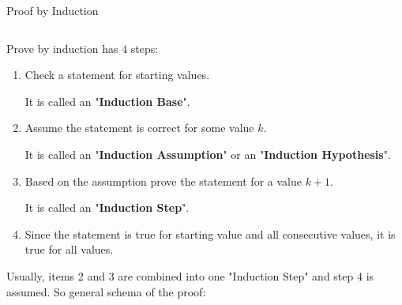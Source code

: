 \documentclass[9pt,aspectratio=169]{beamer}
\begin{document}
\begin{frame}{Proof by Induction}
  \begin{columns}[T]
    \begin{column}{0.5\textwidth}
      Prove by induction has $4$ steps:

      \begin{enumerate}
        \item Check a statement for starting values.

        It is called an "\textbf{Induction Base}".

        \item Assume the statement is correct for some value $k$.
        
        It is called an "\textbf{Induction Assumption}" or an "\textbf{Induction Hypothesis}".

        \item Based on the assumption prove the statement for a value $k+1$.
        
        It is called an "\textbf{Induction Step}".

        \item Since the statement is true for starting value and all consecutive values, it is true for all values.
      \end{enumerate}\pause

      Usually, items 2 and 3 are combined into one "Induction Step" and step 4 is assumed. So general schema of the proof: 


\end{column}
\end{columns}
\end{frame}
\end{document}
